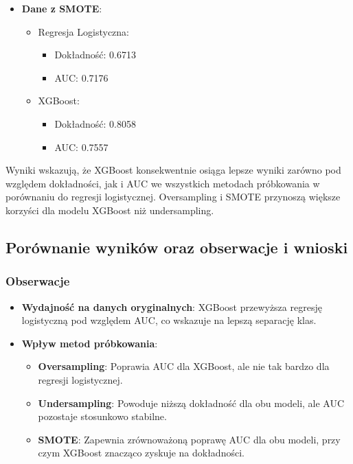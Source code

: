 \documentclass{article}
\begin{document}
\begin{itemize}
    \item \textbf{Dane z SMOTE}:
          \begin{itemize}
              \item Regresja Logistyczna:
                    \begin{itemize}
                        \item Dokładność: 0.6713
                        \item AUC: 0.7176
                    \end{itemize}
              \item XGBoost:
                    \begin{itemize}
                        \item Dokładność: 0.8058
                        \item AUC: 0.7557
                    \end{itemize}
          \end{itemize}
\end{itemize}

Wyniki wskazują, że XGBoost konsekwentnie osiąga lepsze wyniki zarówno pod względem dokładności, jak i AUC we wszystkich metodach próbkowania w porównaniu do regresji logistycznej. Oversampling i SMOTE przynoszą większe korzyści dla modelu XGBoost niż undersampling.

\subsection{Porównanie wyników oraz obserwacje i wnioski}

\subsubsection{Obserwacje}
\begin{itemize}
    \item \textbf{Wydajność na danych oryginalnych}: XGBoost przewyższa regresję logistyczną pod względem AUC, co wskazuje na lepszą separację klas.
    \item \textbf{Wpływ metod próbkowania}:
          \begin{itemize}
              \item \textbf{Oversampling}: Poprawia AUC dla XGBoost, ale nie tak bardzo dla regresji logistycznej.
              \item \textbf{Undersampling}: Powoduje niższą dokładność dla obu modeli, ale AUC pozostaje stosunkowo stabilne.
              \item \textbf{SMOTE}: Zapewnia zrównoważoną poprawę AUC dla obu modeli, przy czym XGBoost znacząco zyskuje na dokładności.
          \end{itemize}
\end{itemize}
\end{document}
